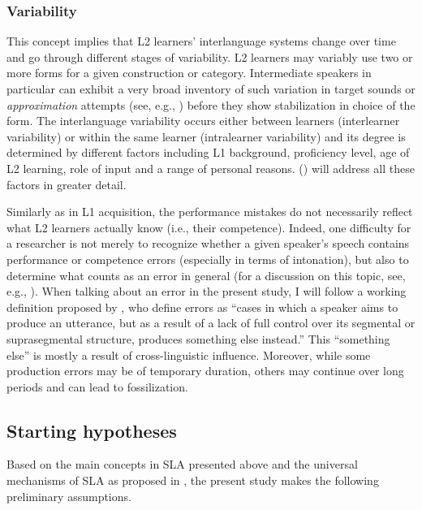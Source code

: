 \subsubsection{Variability}\largerpage
This concept implies that L2 learners’ interlanguage systems change over time and go through different stages of variability. L2 learners may variably use two or more forms for a given construction or category. Intermediate speakers in particular can exhibit a very broad inventory of such variation in target sounds or \textit{approximation} attempts (see, e.g., \citealt{Beebe1984}) before they show stabilization in choice of the form. The interlanguage variability occurs either between learners (interlearner variability) or within the same learner (intralearner variability) and its degree is determined by different factors including L1 background, proficiency level, age of L2 learning, role of input and a range of personal reasons.  () will address all these factors in greater detail.



Similarly as in L1 acquisition, the performance mistakes do not necessarily reflect what L2 learners actually know (i.e., their competence). Indeed, one difficulty for a researcher is not merely to recognize whether a given speaker’s speech contains performance or competence errors (especially in terms of intonation), but also to determine what counts as an error in general (for a discussion on this topic, see, e.g., \citealt{Ringbom1987, GilquinDeCock2011}). When talking about an error in the present study, I will follow a working definition proposed by \citet[57]{DerwingMunro2015}, who define errors as “cases in which a speaker aims to produce an utterance, but as a result of a lack of full control over its segmental or suprasegmental structure, produces something else instead.” This “something else” is mostly a result of cross-linguistic influence. Moreover, while some production errors may be of temporary duration, others may continue over long periods and can lead to fossilization.


\subsection{Starting hypotheses}\label{sec:1.3.2}

Based on the main concepts in SLA presented above and the universal mechanisms of SLA as proposed in \citet{TowellHawkins1994}, the present study makes the following preliminary assumptions.

